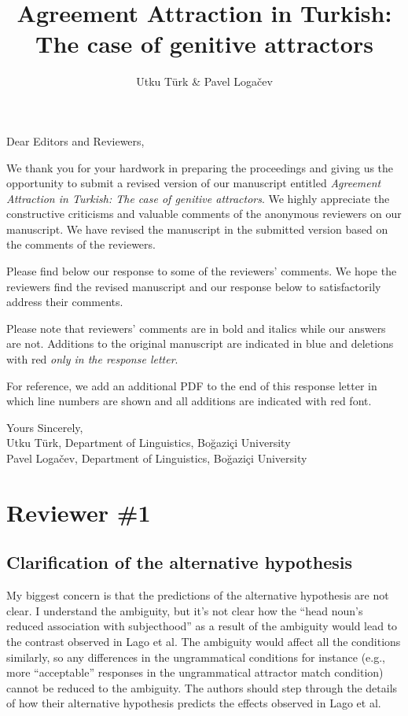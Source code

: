 \documentclass{response}
\title{Agreement Attraction in Turkish: The case of genitive attractors}
\author{Utku T\"urk \& Pavel Loga\v{c}ev}
\begin{document}
\maketitle

Dear Editors and Reviewers, 

We thank you for your hardwork in preparing the proceedings and giving us the opportunity to submit a revised version of our manuscript entitled \emph{Agreement Attraction in Turkish: The case of genitive attractors}. We highly appreciate the constructive criticisms and valuable comments of the anonymous reviewers on our manuscript. We have revised the manuscript in the submitted version based on the comments of the reviewers. 

Please find below our response to some of the reviewers’ comments. We hope the reviewers find the revised manuscript and our response below to satisfactorily address their comments. 

Please note that reviewers' comments are in bold and italics while our answers are not. Additions to the original manuscript are indicated in blue and deletions with red \emph{only in the response letter}. 

For reference, we add an additional PDF to the end of this response letter in which line numbers are shown and all additions are indicated with red font.

Yours Sincerely,\\
Utku T\"urk, Department of Linguistics, Boğaziçi University\\
Pavel Loga\v{c}ev, Department of Linguistics, Boğaziçi University\\

\section{Reviewer \#1}

\subsection{Clarification of the alternative hypothesis}

\RC My biggest concern is that the predictions of the alternative hypothesis are not clear. I understand the ambiguity, but it’s not clear how the “head noun’s reduced association with subjecthood” as a result of the ambiguity would lead to the contrast observed in Lago et al. The ambiguity would affect all the conditions similarly, so any differences in the ungrammatical conditions for instance (e.g., more “acceptable” responses in the ungrammatical attractor match condition) cannot be reduced to the ambiguity. The authors should step through the details of how their alternative hypothesis predicts the effects observed in Lago et al. 
\end{document}
